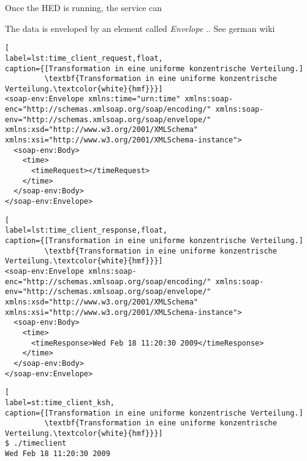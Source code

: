 Once the HED is running, the service can 

The data is enveloped by an element called \textit{Envelope} .. See german wiki

\begin{lstlisting}[
label=lst:time_client_request,float,
caption={[Transformation in eine uniforme konzentrische Verteilung.]
         \textbf{Transformation in eine uniforme konzentrische Verteilung.\textcolor{white}{hmf}}}]
<soap-env:Envelope xmlns:time="urn:time" xmlns:soap-enc="http://schemas.xmlsoap.org/soap/encoding/" xmlns:soap-env="http://schemas.xmlsoap.org/soap/envelope/" xmlns:xsd="http://www.w3.org/2001/XMLSchema" xmlns:xsi="http://www.w3.org/2001/XMLSchema-instance">
  <soap-env:Body>
    <time>
      <timeRequest></timeRequest>
    </time>
  </soap-env:Body>
</soap-env:Envelope>
\end{lstlisting}


\begin{lstlisting}[
label=lst:time_client_response,float,
caption={[Transformation in eine uniforme konzentrische Verteilung.]
         \textbf{Transformation in eine uniforme konzentrische Verteilung.\textcolor{white}{hmf}}}]
<soap-env:Envelope xmlns:soap-enc="http://schemas.xmlsoap.org/soap/encoding/" xmlns:soap-env="http://schemas.xmlsoap.org/soap/envelope/" xmlns:xsd="http://www.w3.org/2001/XMLSchema" xmlns:xsi="http://www.w3.org/2001/XMLSchema-instance">
  <soap-env:Body>
    <time>
      <timeResponse>Wed Feb 18 11:20:30 2009</timeResponse>
    </time>
  </soap-env:Body>
</soap-env:Envelope>
\end{lstlisting}





\begin{minipage}[t]{\textwidth}
\begin{lstlisting}[
label=st:time_client_ksh,
caption={[Transformation in eine uniforme konzentrische Verteilung.]
         \textbf{Transformation in eine uniforme konzentrische Verteilung.\textcolor{white}{hmf}}}]
$ ./timeclient
Wed Feb 18 11:20:30 2009
\end{lstlisting}
\end{minipage}












